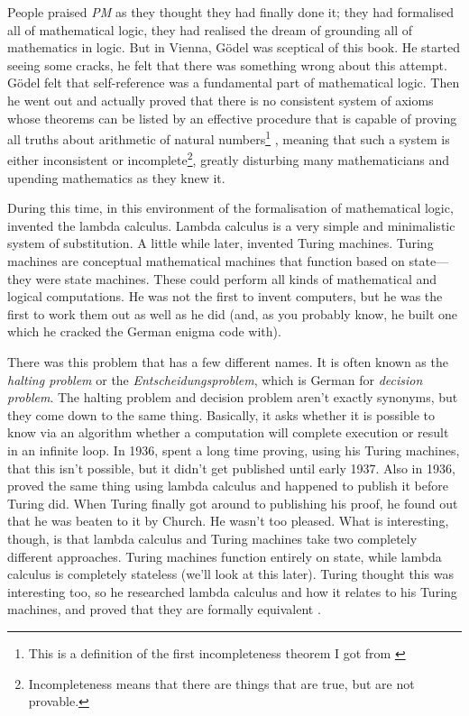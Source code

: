 \documentclass[11pt]{article}
\begin{document}
People praised \emph{PM} as they thought they had finally done it; they had
formalised all of mathematical logic, they had realised the dream of grounding
all of mathematics in logic. But in Vienna, Gödel was sceptical of this book.
He started seeing some cracks, he felt that there was something wrong about
this attempt. Gödel felt that self-reference was a fundamental part of
mathematical logic. Then he went out and actually proved that there is no
consistent system of axioms whose theorems can be listed by an effective
procedure that is capable of proving all truths about arithmetic of natural
numbers\footnote{This is a definition of the first incompleteness theorem I got
from \textcite{wiki:Incompleteness_theorems}} \parencite{godel1931}, meaning
that such a system is either inconsistent or incomplete\footnote{Incompleteness
means that there are things that are true, but are not provable.}, greatly
disturbing many mathematicians and upending mathematics as they knew it.

During this time, in this environment of the formalisation of mathematical
logic, \textcite{church1932} invented the lambda calculus. Lambda calculus is a
very simple and minimalistic system of substitution. A little while later,
\textcite{turing1936, turing1937correction} invented Turing machines. Turing
machines are conceptual mathematical machines that function based on
state---they were state machines. These could perform all kinds of mathematical
and logical computations. He was not the first to invent computers, but he was
the first to work them out as well as he did (and, as you probably know, he
built one which he cracked the German enigma code with).

There was this problem that has a few different names. It is often known as the
\emph{halting problem} or the \emph{Entscheidungsproblem}, which is German for
\emph{decision problem}. The halting problem and decision problem aren't
exactly synonyms, but they come down to the same thing. Basically, it asks
whether it is possible to know via an algorithm whether a computation will
complete execution or result in an infinite loop. In 1936,
\textcite{turing1936, turing1937correction} spent a long time proving, using
his Turing machines, that this isn't possible, but it didn't get published
until early 1937. Also in 1936, \textcite{church1936} proved the same thing
using lambda calculus and happened to publish it before Turing did. When Turing
finally got around to publishing his proof, he found out that he was beaten to
it by Church. He wasn't too pleased. What is interesting, though, is that
lambda calculus and Turing machines take two completely different approaches.
Turing machines function entirely on state, while lambda calculus is completely
stateless (we'll look at this later). Turing thought this was interesting too,
so he researched lambda calculus and how it relates to his Turing machines, and
proved that they are formally equivalent \parencite{turing1937computability}. 
\end{document}
